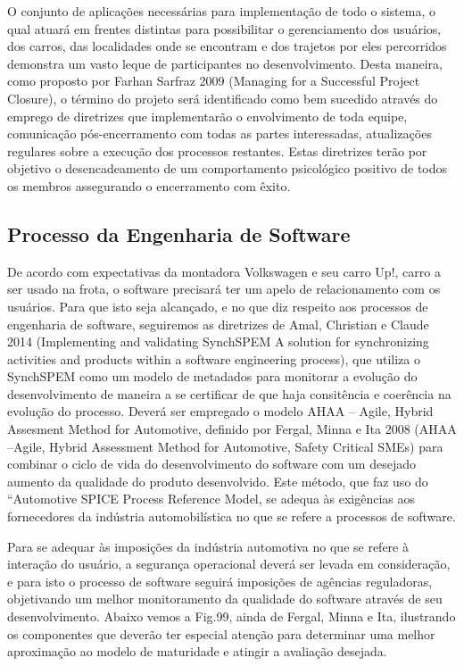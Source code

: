 \documentclass[12pt]{article}
\begin{document}
O conjunto de aplicações necessárias para implementação de todo o sistema, o qual atuará em frentes distintas para possibilitar o gerenciamento dos usuários, dos carros, das localidades onde se encontram e dos trajetos por eles percorridos demonstra um vasto leque de participantes no desenvolvimento. Desta maneira, como proposto por Farhan Sarfraz 2009 (Managing for a Successful Project Closure), o término do projeto será identificado como bem sucedido através do emprego de diretrizes que implementarão o envolvimento de toda equipe, comunicação pós-encerramento com todas as partes interessadas, atualizações regulares sobre a execução dos processos restantes. Estas diretrizes terão por objetivo o desencadeamento de um comportamento psicológico positivo de todos os membros assegurando o encerramento com êxito.


\subsection{Processo da Engenharia de Software}

De acordo com expectativas da montadora Volkswagen e seu carro Up!, carro a ser usado na frota, o software precisará ter um apelo de relacionamento com os usuários. Para que isto seja alcançado, e no que diz respeito aos processos de engenharia de software, seguiremos as diretrizes de Amal, Christian e Claude 2014 (Implementing and validating SynchSPEM A solution for synchronizing activities and products within a software engineering process), que utiliza o SynchSPEM como um modelo de metadados para monitorar a evolução do desenvolvimento de maneira a se certificar de que haja consitência e coerência na evolução do processo.
Deverá ser empregado o modelo AHAA – Agile, Hybrid Assesment Method for Automotive, definido por Fergal, Minna e Ita 2008 (AHAA –Agile, Hybrid Assessment Method for Automotive, Safety Critical SMEs) para combinar o ciclo de vida do desenvolvimento do software com um desejado aumento da qualidade do produto desenvolvido. Este método, que faz uso do “Automotive SPICE Process Reference Model, se adequa às exigências aos fornecedores da indústria automobilística no que se refere a processos de software. 

Para se adequar às imposições da indústria automotiva no que se refere à interação do usuário, a segurança operacional deverá ser levada em consideração, e para isto o processo de software seguirá imposições de agências reguladoras, objetivando um melhor monitoramento da qualidade do software através de seu desenvolvimento. Abaixo vemos a Fig.99, ainda de Fergal, Minna e Ita, ilustrando os componentes que deverão ter especial atenção para determinar uma melhor aproximação ao modelo de maturidade e atingir a avaliação desejada.
\end{document}
